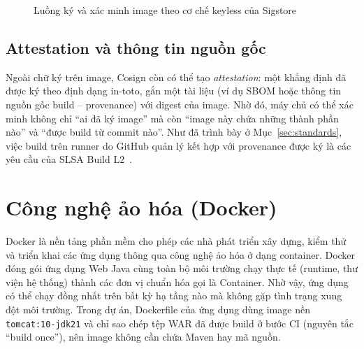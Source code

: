 \documentclass[12pt,a4paper,oneside]{extreport}
\begin{document}
\begin{figure}[!htbp]
  \centering
  \caption{Luồng ký và xác minh image theo cơ chế keyless của Sigstore}
  \label{fig:cosign}
\end{figure}
\FloatBarrier

\subsection{Attestation và thông tin nguồn gốc}
Ngoài chữ ký trên image, Cosign còn có thể tạo \textit{attestation}: một khẳng
định đã được ký theo định dạng in-toto, gắn một tài liệu (ví dụ SBOM hoặc thông
tin nguồn gốc build -- provenance) với digest của image. Nhờ đó, máy chủ có thể
xác minh không chỉ ``ai đã ký image'' mà còn ``image này chứa những thành phần
nào'' và ``được build từ commit nào''. Như đã trình bày ở
Mục~\ref{sec:standards}, việc build trên runner do GitHub quản lý kết hợp với
provenance được ký là các yêu cầu của SLSA Build L2~\cite{slsa}.

\section{Công nghệ ảo hóa (Docker)}
Docker là nền tảng phần mềm cho phép các nhà phát triển xây dựng, kiểm thử và
triển khai các ứng dụng thông qua công nghệ ảo hóa ở dạng container. Docker
đóng gói ứng dụng Web Java cùng toàn bộ môi trường chạy thực tế (runtime, thư
viện hệ thống) thành các đơn vị chuẩn hóa gọi là Container. Nhờ vậy, ứng dụng
có thể chạy đồng nhất trên bất kỳ hạ tầng nào mà không gặp tình trạng xung đột
môi trường. Trong dự án, Dockerfile của ứng dụng dùng image nền
\texttt{tomcat:10-jdk21} và chỉ sao chép tệp WAR đã được build ở bước CI
(nguyên tắc ``build once''), nên image không cần chứa Maven hay mã nguồn.
\end{document}
